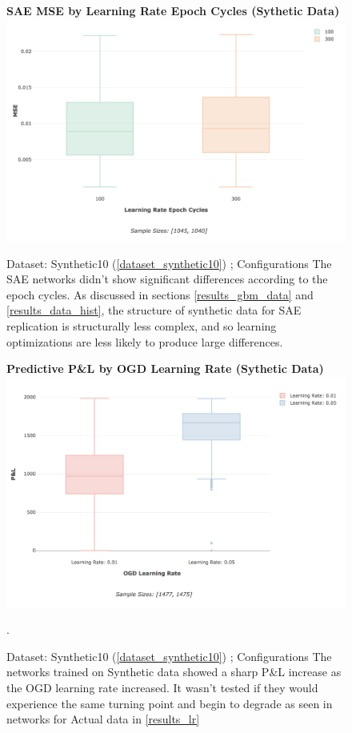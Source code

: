 \documentclass[a4paper,11pt,oneside]{article}
\theoremstyle{plain}
\theoremstyle{definition}
\begin{document}
\begin{figure}[H]
	\centering 
	\textbf{SAE MSE by Learning Rate Epoch Cycles (Sythetic Data)}
	\includegraphics[scale=0.3]{images/results/network/lr/synth_mse_lr_epochs.png} 
	\caption{Dataset: Synthetic10 (\ref{dataset_synthetic10}) ; Configurations 
		\newline The SAE networks didn't show significant differences according to the epoch cycles. As discussed in sections \ref{results_gbm_data} and \ref{results_data_hist}, the structure of synthetic data for SAE replication is structurally less complex, and so learning optimizations are less likely to produce large differences.}
	\label{figure-synth_mse_lr_epochs}
\end{figure}

\begin{figure}[H]
	\centering 
	\textbf{Predictive P\&L by OGD Learning Rate (Sythetic Data)}
	\includegraphics[scale=0.3]{images/results/network/lr/synth_ogd_lr.png} 
	\caption{Dataset: Synthetic10 (\ref{dataset_synthetic10}) ; Configurations 
		\newline The networks trained on Synthetic data showed a sharp P\&L increase as the OGD learning rate increased. It wasn't tested if they would experience the same turning point and begin to degrade as seen in networks for Actual data in \ref{results_lr}}.
	\label{figure-synth_ogd_lr}
\end{figure}
\end{document}

